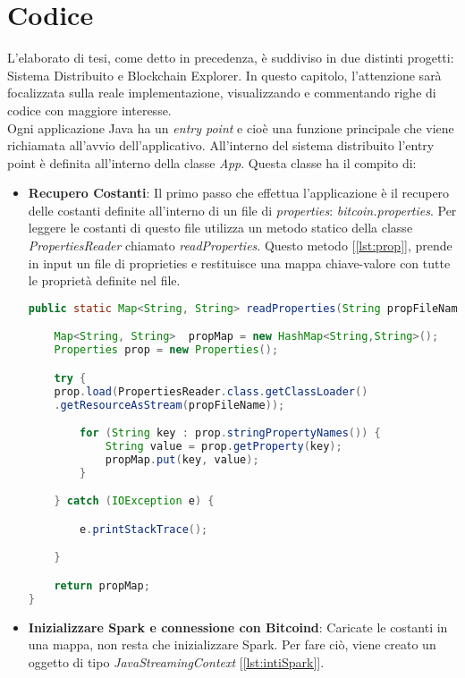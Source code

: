 \section{Codice}
\label{sec:codice}
L'elaborato di tesi, come detto in precedenza, è suddiviso in due distinti progetti: Sistema Distribuito e Blockchain Explorer. In questo capitolo, l'attenzione sarà focalizzata sulla reale implementazione, visualizzando e commentando righe di codice con maggiore interesse.
\\ Ogni applicazione Java ha un \textit{entry point} e cioè una funzione principale che viene richiamata all'avvio dell'applicativo. All'interno del sistema distribuito l'entry point è definita all'interno della classe \textit{App}. Questa classe ha il compito di:
\begin{itemize}
\item \textbf{Recupero Costanti}: Il primo passo che effettua l'applicazione è il recupero delle costanti definite all'interno di un file di \textit{properties}: \textit{bitcoin.properties}. Per leggere le costanti di questo file utilizza un metodo statico della classe \textit{PropertiesReader} chiamato \textit{readProperties}. Questo metodo [\ref{lst:prop}], prende in input un file di proprieties e restituisce una mappa chiave-valore con tutte le proprietà definite nel file.

\begin{lstlisting}[language=Java, label=lst:prop, caption={Metodo readProperties.}]
public static Map<String, String> readProperties(String propFileName){

	Map<String, String>  propMap = new HashMap<String,String>();
	Properties prop = new Properties();

	try {
	prop.load(PropertiesReader.class.getClassLoader()
	.getResourceAsStream(propFileName));

		for (String key : prop.stringPropertyNames()) {
			String value = prop.getProperty(key);
			propMap.put(key, value);
		}

	} catch (IOException e) {

		e.printStackTrace();

	}

	return propMap;
}
\end{lstlisting}

\item \textbf{Inizializzare Spark e connessione con Bitcoind}: Caricate le costanti in una mappa, non resta che inizializzare Spark. Per fare ciò, viene creato un oggetto di tipo \textit{JavaStreamingContext} [\ref{lst:intiSpark}].


\end{itemize}
